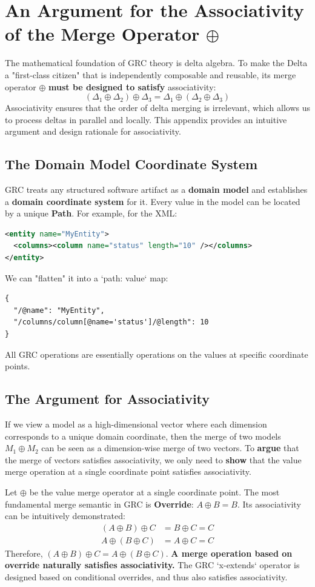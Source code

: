 \documentclass[11pt]{article}
\begin{document}
\section{An Argument for the Associativity of the Merge Operator $\oplus$}

The mathematical foundation of GRC theory is delta algebra. To make the Delta a "first-class citizen" that is independently composable and reusable, its merge operator $\oplus$ \textbf{must be designed to satisfy} associativity:
\[
(\Delta_1 \oplus \Delta_2) \oplus \Delta_3 = \Delta_1 \oplus (\Delta_2 \oplus \Delta_3)
\]
Associativity ensures that the order of delta merging is irrelevant, which allows us to process deltas in parallel and locally. This appendix provides an intuitive argument and design rationale for associativity.

\subsection{The Domain Model Coordinate System}
GRC treats any structured software artifact as a \textbf{domain model} and establishes a \textbf{domain coordinate system} for it. Every value in the model can be located by a unique \textbf{Path}. For example, for the XML:
\begin{lstlisting}[language=XML, numbers=none]
<entity name="MyEntity">
  <columns><column name="status" length="10" /></columns>
</entity>
\end{lstlisting}
We can "flatten" it into a `{path: value}` map:
\begin{verbatim}
{
  "/@name": "MyEntity",
  "/columns/column[@name='status']/@length": 10
}
\end{verbatim}
All GRC operations are essentially operations on the values at specific coordinate points.

\subsection{The Argument for Associativity}
If we view a model as a high-dimensional vector where each dimension corresponds to a unique domain coordinate, then the merge of two models $M_1 \oplus M_2$ can be seen as a dimension-wise merge of two vectors. To \textbf{argue} that the merge of vectors satisfies associativity, we only need to \textbf{show} that the value merge operation at a single coordinate point satisfies associativity.

Let $\oplus$ be the value merge operator at a single coordinate point. The most fundamental merge semantic in GRC is \textbf{Override}: $A \oplus B = B$.
Its associativity can be intuitively demonstrated:
\begin{align*}
(A \oplus B) \oplus C &= B \oplus C = C \\
A \oplus (B \oplus C) &= A \oplus C = C
\end{align*}
Therefore, $(A \oplus B) \oplus C = A \oplus (B \oplus C)$. \textbf{A merge operation based on override naturally satisfies associativity.} The GRC `x-extends` operator is designed based on conditional overrides, and thus also satisfies associativity.
\end{document}
